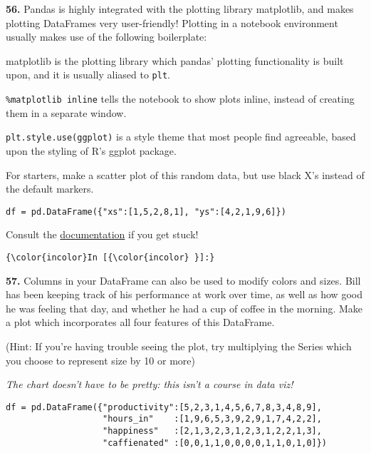 \documentclass[11pt]{article}
\newenvironment{Shaded}{}{}
\newcommand{\StringTok}[1]{\textcolor[rgb]{0.25,0.44,0.63}{{#1}}}
\newcommand{\NormalTok}[1]{{#1}}
\newcommand{\ImportTok}[1]{{#1}}
\newcommand{\OperatorTok}[1]{\textcolor[rgb]{0.40,0.40,0.40}{{#1}}}
\begin{document}
\textbf{56.} Pandas is highly integrated with the plotting library
matplotlib, and makes plotting DataFrames very user-friendly! Plotting
in a notebook environment usually makes use of the following
boilerplate:

\begin{Shaded}
\end{Shaded}

matplotlib is the plotting library which pandas' plotting functionality
is built upon, and it is usually aliased to \texttt{plt}.

\texttt{\%matplotlib\ inline} tells the notebook to show plots inline,
instead of creating them in a separate window.

\texttt{plt.style.use(\textquotesingle{}ggplot\textquotesingle{})} is a
style theme that most people find agreeable, based upon the styling of
R's ggplot package.

For starters, make a scatter plot of this random data, but use black X's
instead of the default markers.

\texttt{df\ =\ pd.DataFrame(\{"xs":{[}1,5,2,8,1{]},\ "ys":{[}4,2,1,9,6{]}\})}

Consult the
\href{https://pandas.pydata.org/pandas-docs/stable/generated/pandas.DataFrame.plot.html}{documentation}
if you get stuck!

    \begin{Verbatim}[commandchars=\\\{\}]
{\color{incolor}In [{\color{incolor} }]:} 
\end{Verbatim}


    \textbf{57.} Columns in your DataFrame can also be used to modify colors
and sizes. Bill has been keeping track of his performance at work over
time, as well as how good he was feeling that day, and whether he had a
cup of coffee in the morning. Make a plot which incorporates all four
features of this DataFrame.

(Hint: If you're having trouble seeing the plot, try multiplying the
Series which you choose to represent size by 10 or more)

\emph{The chart doesn't have to be pretty: this isn't a course in data
viz!}

\begin{verbatim}
df = pd.DataFrame({"productivity":[5,2,3,1,4,5,6,7,8,3,4,8,9],
                   "hours_in"    :[1,9,6,5,3,9,2,9,1,7,4,2,2],
                   "happiness"   :[2,1,3,2,3,1,2,3,1,2,2,1,3],
                   "caffienated" :[0,0,1,1,0,0,0,0,1,1,0,1,0]})
\end{verbatim}
\end{document}
